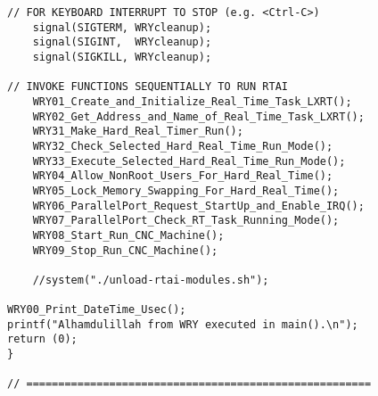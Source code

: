 \begin{lstlisting}[caption={App4-Full C-Code listing for Real Time (RTAI)}, label=App4-Full C-Code listing for Real Time (RTAI)]
// FOR KEYBOARD INTERRUPT TO STOP (e.g. <Ctrl-C>)
	signal(SIGTERM, WRYcleanup);
	signal(SIGINT,  WRYcleanup);
	signal(SIGKILL, WRYcleanup);
	
// INVOKE FUNCTIONS SEQUENTIALLY TO RUN RTAI
	WRY01_Create_and_Initialize_Real_Time_Task_LXRT();
	WRY02_Get_Address_and_Name_of_Real_Time_Task_LXRT();
	WRY31_Make_Hard_Real_Timer_Run(); 
	WRY32_Check_Selected_Hard_Real_Time_Run_Mode(); 
	WRY33_Execute_Selected_Hard_Real_Time_Run_Mode();
	WRY04_Allow_NonRoot_Users_For_Hard_Real_Time();
	WRY05_Lock_Memory_Swapping_For_Hard_Real_Time();
	WRY06_ParallelPort_Request_StartUp_and_Enable_IRQ(); 
	WRY07_ParallelPort_Check_RT_Task_Running_Mode();
	WRY08_Start_Run_CNC_Machine();
	WRY09_Stop_Run_CNC_Machine();
	
	//system("./unload-rtai-modules.sh");

WRY00_Print_DateTime_Usec(); 
printf("Alhamdulillah from WRY executed in main().\n"); 
return (0);
}

// ======================================================
\end{lstlisting}

\pagebreak

